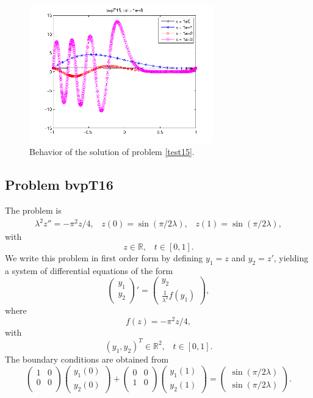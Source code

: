 \documentclass[<options>]{article}
\def \RR {{\mathbb{R}}}
\begin{document}
\begin{figure}[htb]
\centerline{\includegraphics[height=6cm]{Prob15}}
\caption{Behavior of the solution of problem \ref{test15}.}
\end{figure}
\newpage
\subsection{Problem bvpT16}\label{test16}
The problem is 
\begin{eqnarray*}
\lambda^{2} z'' = -\pi^{2} z / 4, \;\;\;z(0) = \sin(\pi / 2\lambda), \;\;\; z(1) = \sin(\pi / 2\lambda),
\end{eqnarray*}
with
\[
z \in \RR, \;\;\; t\in [0,1].
\]
We write this problem in first order form by defining $y_1=z$ and $y_2=z'$, yielding a system of differential equations of the form
\begin{equation*}
\left(\begin{array}{c}
y_1\\
y_2
\end{array}\right)'=
\left(\begin{array}{c}
y_2\\
\frac{1}{\lambda^{2}}f(y_1)
\end{array}\right),
\end{equation*}
where
\begin{equation*}
f(z) = -\pi^{2} z / 4,
\end{equation*}
with
\[
(y_1,y_2)^T \in \RR^{2}, \;\;\;  t \in [0,1].
\]
The  boundary conditions are obtained from
\begin{equation*}
\left(
  \begin{array}{cc}
    1 & 0 \\
    0 & 0 \\
  \end{array}
\right)
\left(\begin{array}{c}
y_{1}(0)\\
y_{2}(0)
\end{array}\right)
+
\left(
  \begin{array}{cc}
    0 & 0 \\
    1 & 0 \\
  \end{array}
\right)
\left(\begin{array}{c}
y_{1}(1)\\
y_{2}(1)
\end{array}\right)=\left(\begin{array}{c}
\sin(\pi / 2\lambda) \\
\sin(\pi / 2\lambda)
\end{array}\right).
\end{equation*}
\end{document}

